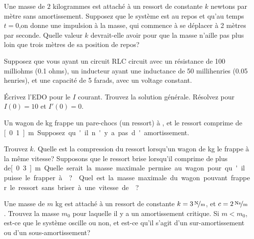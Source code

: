 \setcounter{exercise}{100}

\begin{exercise}
	Une masse de $2$ kilogrammes est attaché à un ressort de constante $k$ newtons par
	mètre sans amortissement. Supposez que le système est au repos et qu'au temps  $t=0$,on donne une impulsion à la masse, qui  commence à se déplacer à 2 mètres par seconde. Quelle valeur $k$ devrait-elle avoir pour que la masse n'aille pas plus loin que trois mètres de sa position de repos?
\end{exercise}

\begin{exercise}
	Supposez que vous ayant un  circuit RLC circuit avec un résistance de 100 milliohms (0.1 ohms),
	un inducteur ayant une inductance de 50 millihenries (0.05 henries), et une capacité de 5 farads, avec un voltage constant. 
	\begin{tasks}
		\task Écrivez l'EDO pour le $I$ courant.
		\task Trouvez la solution générale. 
		\task Résolvez pour  $I(0) = 10$ et $I'(0) = 0$.
	\end{tasks}
\end{exercise}

\begin{exercise}
	\pagebreak[2]
	Un wagon de  \unit[5000]{kg} frappe un pare-chocs (un ressort) à \unitfrac[1]{m}{s},
	et le ressort comprime de  \unit[0.1]{m}. Supposez qu'il n'y a pas d'amortissement.  
	
	\begin{tasks}
		\task Trouvez $k$.
		\task Quelle est la compression du ressort lorsqu'un wagon de \unit[10000]{kg} le frappe à la même vitesse?
		\task Supposons que le ressort brise lorsqu'il comprime de plus de\unit[0.3]{m}.  
				Quelle serait la masse maximale permise au wagon pour qu'il puisse le frapper à  \unitfrac[1]{m}{s}?
		\task Quel est la masse maximale du wagon pouvant frapper le ressort sans briser à une vitesse de \unitfrac[2]{m}{s}?
	\end{tasks}
\end{exercise}

\begin{exercise}
	Une masse de $m$ \unit{kg} est attaché à un ressort de constante $k=\unitfrac[3]{N}{m}$, et
	$c=\unitfrac[2]{Ns}{m}$.  Trouvez la masse  $m_0$ pour laquelle il y a un amortissement critique. Si $m < m_0$, est-ce que le système oscille ou non, et est-ce qu'il s'agit d'un sur-amortissement ou d'un sous-amortissement? 
\end{exercise}

